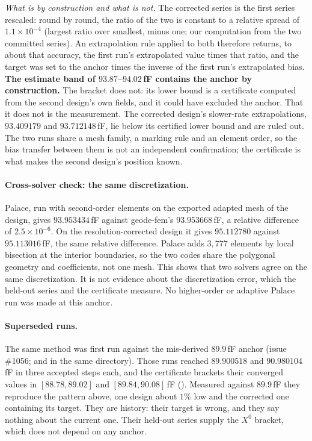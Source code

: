\documentclass{anvil-paper}
\begin{document}
\emph{What is by construction and what is not.} The corrected series is
the first series rescaled: round by round, the ratio of the two is
constant to a relative spread of $1.1\times10^{-4}$ (largest ratio over
smallest, minus one; our computation from the two committed series). An
extrapolation rule applied to both therefore returns, to about that
accuracy, the first run's extrapolated value times that ratio, and the
target was set to the anchor times the inverse of the first run's
extrapolated bias. \textbf{The estimate band of $93.87$--$94.02$\,fF
contains the anchor by construction.} The bracket does not: its lower
bound is a certificate computed from the second design's own fields,
and it could have excluded the anchor. That it does not is the
measurement. The corrected design's slower-rate extrapolations,
$93.409179$ and $93.712148$\,fF, lie below its certified lower bound
and are ruled out. The two runs share a mesh family, a marking rule and
an element order, so the bias transfer between them is not an
independent confirmation; the certificate is what makes the second
design's position known.

\paragraph{Cross-solver check: the same discretization.}
Palace, run with second-order elements on the exported adapted mesh of
the design, gives $93.953434$\,fF against geode-fem's $93.953668$\,fF,
a relative difference of $2.5\times10^{-6}$. On the resolution-corrected
design it gives $95.112780$ against $95.113016$\,fF, the same relative
difference. Palace adds $3{,}777$ elements by local bisection at the
interior boundaries, so the two codes share the polygonal geometry and
coefficients, not one mesh. This shows that two solvers agree on the
same discretization. It is not evidence about the discretization error,
which the held-out series and the certificate measure. No higher-order
or adaptive Palace run was made at this anchor.

\paragraph{Superseded runs.}
The same method was first run against the mis-derived $89.9$\,fF anchor
(issue \#1056;  and
 in the same directory). Those
runs reached $89.900518$ and $90.980104$\,fF in three accepted steps
each, and the certificate brackets their converged values in
$[88.78, 89.02]$ and $[89.84, 90.08]$\,fF
(). Measured
against $89.9$\,fF they reproduce the pattern above, one design about
$1\%$ low and the corrected one containing its target. They are history:
their target is wrong, and they say nothing about the current one. Their
held-out series supply the $X^0$ bracket, which does not depend on any
anchor.
\end{document}
